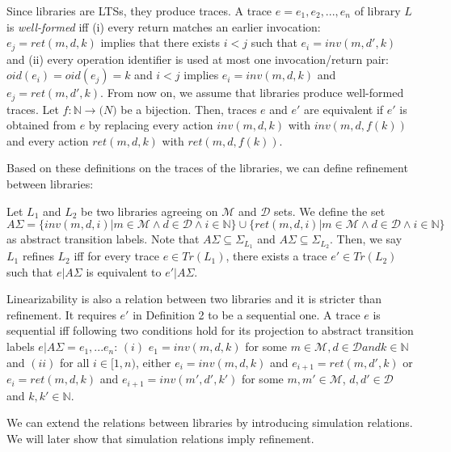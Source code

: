 Since libraries are LTSs, they produce traces. A trace $e = e_1, e_2, ..., e_n$ of library $L$ is \emph{well-formed} iff (i) every return matches an earlier invocation: $e_j = ret(m,d,k)$ implies that there exists $i<j$ such that $e_i = inv(m,d',k)$ and (ii) every operation identifier is used at most one invocation/return pair: $oid(e_i) = oid(e_j) = k$ and $i<j$ implies $e_i = inv(m,d,k)$ and $e_j = ret(m,d',k)$. From now on, we assume that libraries produce well-formed traces. Let $f: \mathbb{N} \rightarrow \mathbb(N)$ be a bijection. Then, traces $e$ and $e'$ are equivalent if $e'$ is obtained from $e$ by replacing every action $inv(m,d,k)$ with $inv(m,d,f(k))$ and every action $ret(m,d,k)$ with $ret(m,d,f(k))$. 

Based on these definitions on the traces of the libraries, we can define refinement between libraries:
\begin{dfn}
Let $L_1$ and $L_2$ be two libraries agreeing on $\mathcal{M}$ and $\mathcal{D}$ sets. We define the set $A\Sigma = \{inv(m,d,i)| m \in \mathcal{M} \wedge d \in \mathcal{D} \wedge i \in \mathbb{N}\} \cup \{ret(m,d,i)| m \in \mathcal{M}\wedge d \in \mathcal{D} \wedge i \in \mathbb{N}\}$ as abstract transition labels. Note that $A\Sigma \subseteq \Sigma_{L_1}$ and $A\Sigma \subseteq \Sigma_{L_2}$. Then, we say $L_1$ refines $L_2$ iff for every trace $e \in Tr(L_1)$, there exists a trace $e' \in Tr(L_2)$ such that $e|A\Sigma$ is equivalent to $e'|A\Sigma$.
\end{dfn}
Linearizability is also a relation between two libraries and it is stricter than refinement. It requires $e'$ in Definition 2 to be a sequential one. A trace $e$ is sequential iff following two conditions hold for its projection to abstract transition labels $e|A\Sigma = e_1, ...e_n$: $(i)$ $e_1 = inv(m,d,k)$ for some $m \in \mathcal{M}, d \in \mathcal{D} and k \in \mathbb{N}$ and $(ii)$ for all $i \in [1,n)$, either $e_i = inv(m,d,k)$ and $e_{i+1} = ret(m,d',k)$ or $e_i = ret(m,d,k)$ and $e_{i+1} = inv(m',d',k')$ for some $m,m' \in \mathcal{M}$, $d,d' \in \mathcal{D}$ and $k,k' \in \mathbb{N}$.

We can extend the relations between libraries by introducing simulation relations. We will later show that simulation relations imply refinement. 

